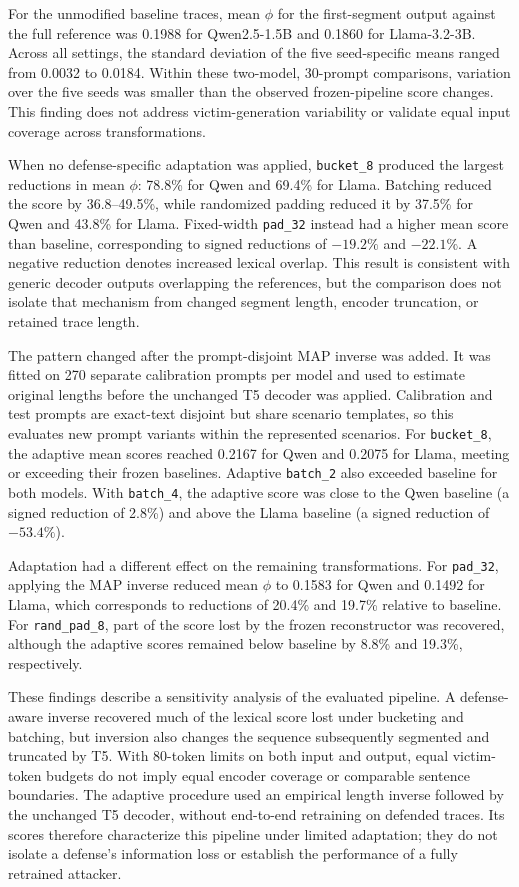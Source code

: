\documentclass[electronics,article,submit,pdftex,moreauthors]{Definitions/mdpi}
\begin{document}
For the unmodified baseline traces, mean $\phi$ for the first-segment output against the full reference was 0.1988 for Qwen2.5-1.5B and 0.1860 for Llama-3.2-3B. Across all settings, the standard deviation of the five seed-specific means ranged from 0.0032 to 0.0184. Within these two-model, 30-prompt comparisons, variation over the five seeds was smaller than the observed frozen-pipeline score changes. This finding does not address victim-generation variability or validate equal input coverage across transformations.

When no defense-specific adaptation was applied, \texttt{bucket\_8} produced the largest reductions in mean $\phi$: 78.8\% for Qwen and 69.4\% for Llama. Batching reduced the score by 36.8--49.5\%, while randomized padding reduced it by 37.5\% for Qwen and 43.8\% for Llama. Fixed-width \texttt{pad\_32} instead had a higher mean score than baseline, corresponding to signed reductions of $-19.2\%$ and $-22.1\%$. A negative reduction denotes increased lexical overlap. This result is consistent with generic decoder outputs overlapping the references, but the comparison does not isolate that mechanism from changed segment length, encoder truncation, or retained trace length.

The pattern changed after the prompt-disjoint MAP inverse was added. It was fitted on 270 separate calibration prompts per model and used to estimate original lengths before the unchanged T5 decoder was applied. Calibration and test prompts are exact-text disjoint but share scenario templates, so this evaluates new prompt variants within the represented scenarios. For \texttt{bucket\_8}, the adaptive mean scores reached 0.2167 for Qwen and 0.2075 for Llama, meeting or exceeding their frozen baselines. Adaptive \texttt{batch\_2} also exceeded baseline for both models. With \texttt{batch\_4}, the adaptive score was close to the Qwen baseline (a signed reduction of 2.8\%) and above the Llama baseline (a signed reduction of $-53.4\%$).

Adaptation had a different effect on the remaining transformations. For \texttt{pad\_32}, applying the MAP inverse reduced mean $\phi$ to 0.1583 for Qwen and 0.1492 for Llama, which corresponds to reductions of 20.4\% and 19.7\% relative to baseline. For \texttt{rand\_pad\_8}, part of the score lost by the frozen reconstructor was recovered, although the adaptive scores remained below baseline by 8.8\% and 19.3\%, respectively.

These findings describe a sensitivity analysis of the evaluated pipeline. A defense-aware inverse recovered much of the lexical score lost under bucketing and batching, but inversion also changes the sequence subsequently segmented and truncated by T5. With 80-token limits on both input and output, equal victim-token budgets do not imply equal encoder coverage or comparable sentence boundaries. The adaptive procedure used an empirical length inverse followed by the unchanged T5 decoder, without end-to-end retraining on defended traces. Its scores therefore characterize this pipeline under limited adaptation; they do not isolate a defense's information loss or establish the performance of a fully retrained attacker.
\end{document}
